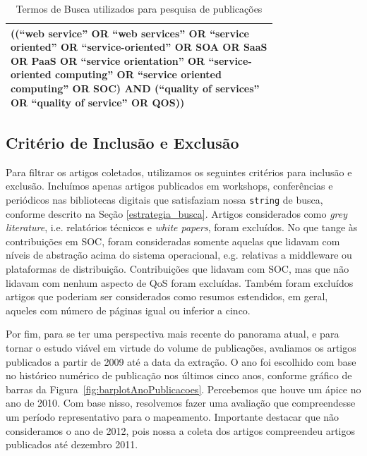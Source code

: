 \begin{table}[ht]
\centering
\caption{Termos de Busca utilizados para pesquisa de publicações}
\label{tab:exTable1}
\begin{tabular}{p{0.75\linewidth}}
\hline
((``web service'' OR ``web services'' OR ``service oriented'' OR ``service-oriented'' OR SOA OR SaaS OR PaaS OR ``service orientation'' OR ``service-oriented computing'' OR ``service oriented computing'' OR SOC) AND (``quality of services'' OR ``quality of service'' OR QOS)) \\
\hline
\end{tabular}
\end{table}


\subsection{Crit\'{e}rio de Inclusão e Exclusão}

Para filtrar os artigos coletados, utilizamos os seguintes critérios para inclus\~{a}o e exclus\~{a}o. Inclu\'{i}mos apenas artigos publicados em workshops, confer\^{e}ncias e peri\'{o}dicos nas bibliotecas digitais que satisfaziam nossa \texttt{string} de busca, conforme descrito na Se\c{c}\~{a}o \ref{estrategia_busca}. Artigos considerados como \emph{grey literature}, i.e. relat\'{o}rios t\'{e}cnicos e \emph{white papers}, foram exclu\'{i}dos. No que tange \`{a}s contribui\c{c}\~{o}es em SOC, foram consideradas somente aquelas que lidavam com n\'{i}veis de abstra\c{c}\~{a}o acima do sistema operacional, e.g. relativas a middleware ou plataformas de distribui\c{c}\~{a}o. Contribui\c{c}\~{o}es que lidavam com SOC, mas que n\~{a}o lidavam com nenhum aspecto de QoS foram exclu\'{i}das. Tamb\'{e}m foram exclu\'{i}dos artigos que poderiam ser considerados como resumos estendidos, em geral, aqueles com n\'{u}mero de p\'{a}ginas igual ou inferior a cinco. 

Por fim, para se ter uma perspectiva mais recente do panorama atual, e para tornar o estudo vi\'{a}vel em virtude do volume de publica\c{c}\~{o}es, avaliamos os artigos publicados a partir de 2009 at\'{e} a data da extra\c{c}\~{a}o. O ano foi escolhido com base no hist\'{o}rico num\'{e}rico de publica\c{c}\~{a}o nos \'{u}ltimos cinco anos, conforme gr\'{a}fico de barras da  Figura~\ref{fig:barplotAnoPublicacoes}. Percebemos que houve um \'{a}pice no ano de 2010. Com base nisso, resolvemos fazer uma avalia\c{c}\~{a}o que compreendesse um per\'{i}odo representativo para o mapeamento. Importante destacar que n\~{a}o consideramos o ano de 2012, pois 
nossa a coleta dos artigos compreendeu artigos publicados at\'{e} dezembro 2011.

